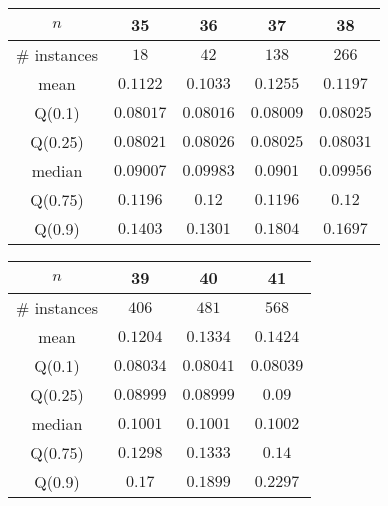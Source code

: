 \begin{tabular}{c|cccc} 
\hline 
$n$ & 35 & 36 & 37 & 38 \tabularnewline 
\hline 
\hline 
\# instances & $18$ & $42$ & $138$ & $266$ \tabularnewline 
mean & $0.1122$ & $0.1033$ & $0.1255$ & $0.1197$ \tabularnewline 
Q(0.1) & $0.08017$ & $0.08016$ & $0.08009$ & $0.08025$ \tabularnewline 
Q(0.25) & $0.08021$ & $0.08026$ & $0.08025$ & $0.08031$ \tabularnewline 
median & $0.09007$ & $0.09983$ & $0.0901$ & $0.09956$ \tabularnewline 
Q(0.75) & $0.1196$ & $0.12$ & $0.1196$ & $0.12$ \tabularnewline 
Q(0.9) & $0.1403$ & $0.1301$ & $0.1804$ & $0.1697$ \tabularnewline 
\hline 
\end{tabular} 
\medskip{} 

\begin{tabular}{c|ccc} 
\hline 
$n$ & 39 & 40 & 41 \tabularnewline 
\hline 
\hline 
\# instances & $406$ & $481$ & $568$ \tabularnewline 
mean & $0.1204$ & $0.1334$ & $0.1424$ \tabularnewline 
Q(0.1) & $0.08034$ & $0.08041$ & $0.08039$ \tabularnewline 
Q(0.25) & $0.08999$ & $0.08999$ & $0.09$ \tabularnewline 
median & $0.1001$ & $0.1001$ & $0.1002$ \tabularnewline 
Q(0.75) & $0.1298$ & $0.1333$ & $0.14$ \tabularnewline 
Q(0.9) & $0.17$ & $0.1899$ & $0.2297$ \tabularnewline 
\hline 
\end{tabular} 
\medskip{} 

